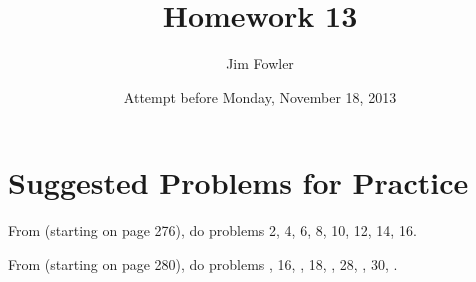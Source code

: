 \documentclass[12pt]{handout}
\title{Homework 13}
\date{Attempt before Monday, November 18, 2013}
\author{Jim Fowler}
\begin{document}
\maketitle











\section*{Suggested Problems for Practice}

From  (starting on page 276),
do problems 2, 4, 6, 8, 10, 12, 14, 16.
\vspace{1ex}

From  (starting on page 280),
do problems , 16, , 18, , 28, , 30, .
\vspace{1ex}
\end{document}
